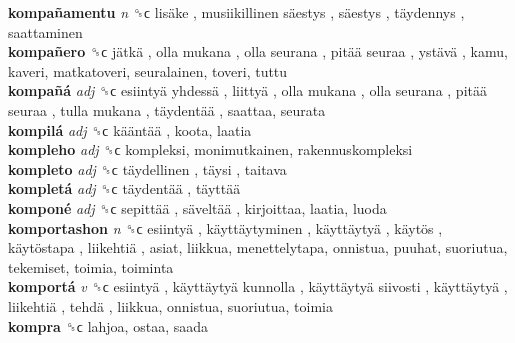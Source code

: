 \textbf{kompañamentu} \emph{n}  ␝ϲ   lisäke ,  musiikillinen säestys ,  säestys ,  täydennys , saattaminen  \\
\textbf{kompañero} ␝ϲ   jätkä ,  olla mukana ,  olla seurana ,  pitää seuraa ,  ystävä , kamu, kaveri, matkatoveri, seuralainen, toveri, tuttu  \\
\textbf{kompañá} \emph{adj}  ␝ϲ   esiintyä yhdessä ,  liittyä ,  olla mukana ,  olla seurana ,  pitää seuraa ,  tulla mukana ,  täydentää , saattaa, seurata  \\
\textbf{kompilá} \emph{adj}  ␝ϲ   kääntää , koota, laatia  \\
\textbf{kompleho} \emph{adj}  ␝ϲ  kompleksi, monimutkainen, rakennuskompleksi  \\
\textbf{kompleto} \emph{adj}  ␝ϲ   täydellinen ,  täysi , taitava  \\
\textbf{kompletá} \emph{adj}  ␝ϲ   täydentää ,  täyttää   \\
\textbf{komponé} \emph{adj}  ␝ϲ   sepittää ,  säveltää , kirjoittaa, laatia, luoda  \\
\textbf{komportashon} \emph{n}  ␝ϲ   esiintyä ,  käyttäytyminen ,  käyttäytyä ,  käytös ,  käytöstapa ,  liikehtiä , asiat, liikkua, menettelytapa, onnistua, puuhat, suoriutua, tekemiset, toimia, toiminta  \\
\textbf{komportá} \emph{v}  ␝ϲ   esiintyä ,  käyttäytyä kunnolla ,  käyttäytyä siivosti ,  käyttäytyä ,  liikehtiä ,  tehdä , liikkua, onnistua, suoriutua, toimia  \\
\textbf{kompra} ␝ϲ  lahjoa, ostaa, saada  \\
